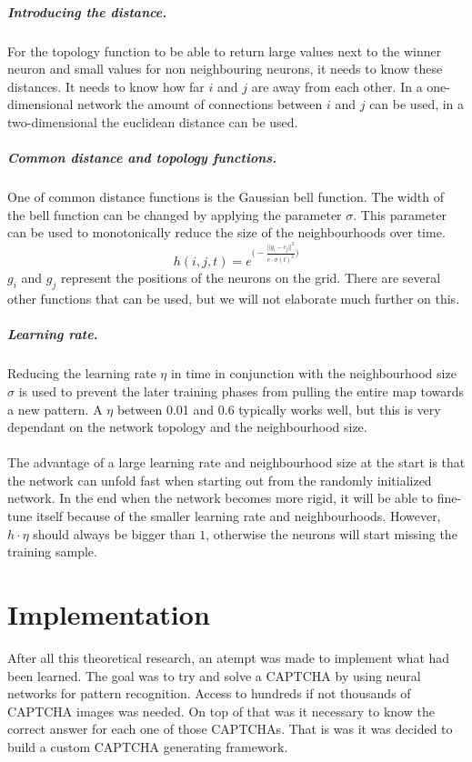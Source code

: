 \documentclass[pdftex,a4paper,12pt,twoside]{report}
\theoremstyle{plain} \newtheorem{theorem}{Theorem} \newtheorem{proposition}{Proposition} \newtheorem{lemma}{Lemma} \newtheorem*{corollary}{Corollary}
\theoremstyle{definition} \newtheorem{definition}{Definition} \newtheorem{conjecture}{Conjecture} \newtheorem*{example}{Example} \newtheorem{algorithm}{Algorithm}
\theoremstyle{remark} \newtheorem*{remark}{Remark} \newtheorem*{note}{Note} \newtheorem{case}{Case}
\begin{document}
\subparagraph{Introducing the distance.}
For the topology function to be able to return large values next to the winner neuron and small values for non neighbouring neurons, it needs to know these distances. It needs to know how far $i$ and $j$ are away from each other. In a one-dimensional network the amount of connections between $i$ and $j$ can be used, in a two-dimensional the euclidean distance can be used.
\subparagraph{Common distance and topology functions.}
One of common distance functions is the Gaussian bell function. The width of the bell function can be changed by applying the parameter $\sigma$. This parameter can be used to monotonically reduce the size of the neighbourhoods over time.
\begin{equation}
h(i,j,t) = e^{ \big( - \frac{||g_i-c_j||^2}{e \cdot \sigma (t)^2} \big) }
\end{equation}
$g_i$ and $g_j$ represent the positions of the neurons on the grid. There are several other functions that can be used, but we will not elaborate much further on this.
\subparagraph{Learning rate.}
Reducing the learning rate $\eta$ in time in conjunction with the neighbourhood size $\sigma$ is used to prevent the later training phases from pulling the entire map towards a new pattern. A $\eta$ between 0.01 and 0.6 typically works well, but this is very dependant on the network topology and the neighbourhood size.\\\\The advantage of a large learning rate and neighbourhood size at the start is that the network can unfold fast when starting out from the randomly initialized network. In the end when the network becomes more rigid, it will be able to fine-tune itself because of the smaller learning rate and neighbourhoods. However, $h \cdot \eta$ should always be bigger than $1$, otherwise the neurons will start missing the training sample.
\section{Implementation}
\label{sec:implementation}
After all this theoretical research, an atempt was made to implement what had been learned. The goal was to try and solve a CAPTCHA by using neural networks for pattern recognition. Access to hundreds if not thousands of CAPTCHA images was needed. On top of that was it necessary to know the correct answer for each one of those CAPTCHAs. That is was it was decided to build a custom CAPTCHA generating framework.
\end{document}
